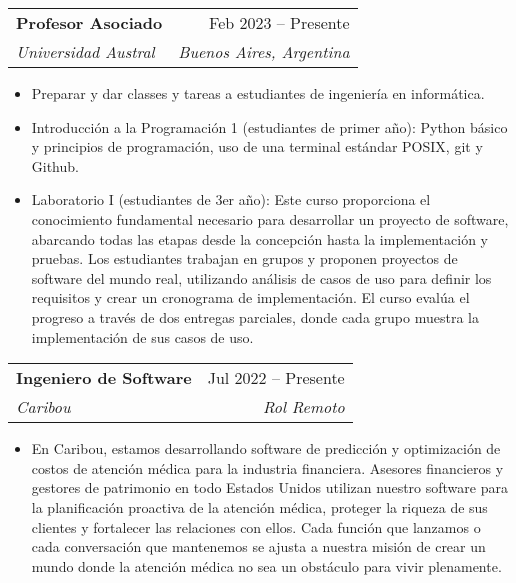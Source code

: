 \documentclass[letterpaper,11pt]{article}
\makeatletter
\newcommand{\resumeItem}[1]{
  \item\small{
    {#1 \vspace{-2pt}}
  }
}
\newcommand{\resumeSubheading}[4]{
  \vspace{-2pt}\item
    \begin{tabular*}{0.97\textwidth}[t]{l@{\extracolsep{\fill}}r}
      \textbf{#1} & #2 \\
      \textit{\small#3} & \textit{\small #4} \\
    \end{tabular*}\vspace{-7pt}
}
\newcommand{\resumeSubSubheading}[2]{
    \item
    \begin{tabular*}{0.97\textwidth}{l@{\extracolsep{\fill}}r}
      \textit{\small#1} & \textit{\small #2} \\
    \end{tabular*}\vspace{-7pt}
}
\newcommand{\resumeSubHeadingListEnd}{\end{itemize}}
\newcommand{\resumeItemListStart}{\begin{itemize}}
\newcommand{\resumeItemListEnd}{\end{itemize}\vspace{-5pt}}
\makeatother
\begin{document}
    \resumeSubheading
      {Profesor Asociado}{Feb 2023 -- Presente}
      {Universidad Austral}{Buenos Aires, Argentina}
      \resumeItemListStart
        \resumeItem{Preparar y dar classes y tareas a estudiantes de ingeniería en informática.}
        \resumeItem{Introducción a la Programación 1 (estudiantes de primer año): Python básico y principios de programación, uso de una terminal estándar POSIX, git y Github.}
        \resumeItem{Laboratorio I (estudiantes de 3er año):
        Este curso proporciona el conocimiento fundamental necesario para desarrollar un proyecto de software, abarcando todas las etapas desde la concepción hasta la implementación y pruebas. Los estudiantes trabajan en grupos y proponen proyectos de software del mundo real, utilizando análisis de casos de uso para definir los requisitos y crear un cronograma de implementación. El curso evalúa el progreso a través de dos entregas parciales, donde cada grupo muestra la implementación de sus casos de uso.}
        \resumeItemListEnd
    \resumeSubheading
      {Ingeniero de Software}{Jul 2022 -- Presente}
      {Caribou}{Rol Remoto}
      \resumeItemListStart
        \resumeItem{En Caribou, estamos desarrollando software de predicción y optimización de costos de atención médica para la industria financiera. Asesores financieros y gestores de patrimonio en todo Estados Unidos utilizan nuestro software para la planificación proactiva de la atención médica, proteger la riqueza de sus clientes y fortalecer las relaciones con ellos. Cada función que lanzamos o cada conversación que mantenemos se ajusta a nuestra misión de crear un mundo donde la atención médica no sea un obstáculo para vivir plenamente.}
      \resumeItemListEnd
      
\end{document}
